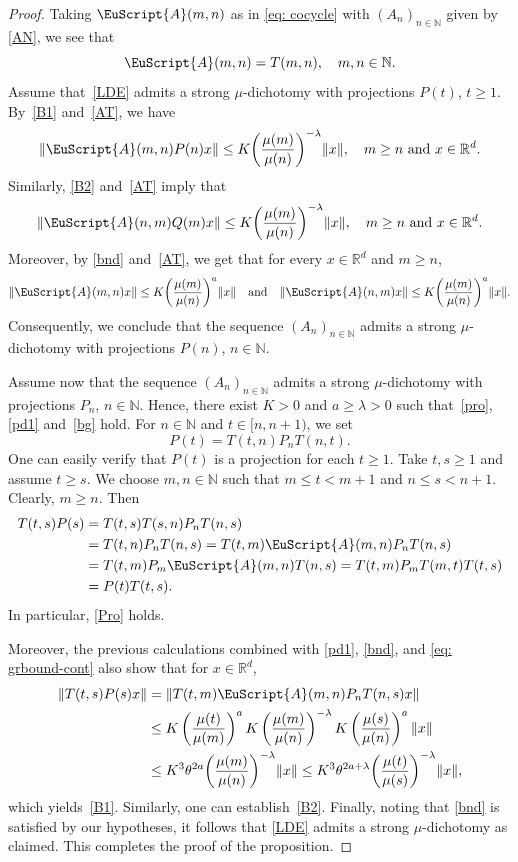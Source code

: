 \documentclass[reqno, a4paper, 10pt]{amsart}
\theoremstyle{plain}
\numberwithin{equation}{section}
\theoremstyle{remark}
\def\N{\mathbb{N}}
\def\cA{\EuScript{A}}
\def\R{\mathbb{R}}
\begin{document}
\begin{proof}
Taking $\cA(m,n)$ as in \eqref{eq: cocycle} with $(A_n)_{n\in \N}$ given by \eqref{AN}, we see that
\begin{equation}\label{AT}
\cA(m,n)=T(m,n), \quad m, n\in \N.
\end{equation}
Assume that~\eqref{LDE} admits a strong $\mu$-dichotomy with projections $P(t)$, $t\ge 1$. By~\eqref{B1} and~\eqref{AT}, we have
\[
\| \cA(m,n)P(n)x\| \le K \bigg (\frac{\mu(m)}{\mu (n)}\bigg )^{-\lambda}\|x\|, \quad m\ge n \text{ and }x\in\R^d.
\]
Similarly, \eqref{B2} and~\eqref{AT} imply that 
\[
\| \cA(n,m)Q(m)x\| \le K \bigg (\frac{\mu(m)}{\mu (n)}\bigg )^{-\lambda}\|x\|, \quad m\ge n \text{ and }x\in\R^d.
\]
Moreover, by \eqref{bnd} and~\eqref{AT}, we get that for every $x\in \R^d$ and $m\ge n$,
\begin{equation*}
\| \cA(m,n)x\| \le {K}\bigg (\frac{\mu (m)}{\mu(n)}\bigg )^{a}\|x\| \quad \text{and} \quad \| \cA(n,m)x\| \le {K}\bigg (\frac{\mu (m)}{\mu(n)}\bigg )^{a}\|x\|.
\end{equation*}
Consequently, we conclude that the sequence $(A_n)_{n\in \N}$ admits a strong $\mu$-dichotomy with projections $P(n)$, $n\in \N$.

Assume now that the sequence $(A_n)_{n\in \N}$ admits a strong $\mu$-dichotomy with projections $P_n$, $n\in \N$. Hence, there exist $K>0$ and $a\geq \lambda >0$ such that~\eqref{pro}, \eqref{pd1} and~\eqref{bg} hold.
For $n\in \N$ and $t\in [n, n+1)$, we set
\[
P(t)=T(t,n)P_n T(n,t).
\]
One can easily verify that $P(t)$ is a projection for each $t\ge 1$.
Take $t,s\geq 1$ and assume $t\geq s$. We choose $m, n\in \N$ such that $m\le t<m+1$ and $n\le s <n+1$. Clearly, $m\ge n$. Then
\[
\begin{split}
T(t,s)P(s)&=T(t,s)T(s,n)P_nT(n, s)\\
&=T(t,n)P_n T(n,s) =T(t,m)\cA(m,n)P_n T(n,s)\\
&=T(t,m)P_m\cA(m,n) T(n,s)=T(t,m)P_m T(m,t)T(t,s)\\
&=P(t)T(t,s).
\end{split}
\]
In particular, \eqref{Pro} holds. 

Moreover, the previous calculations combined with \eqref{pd1}, \eqref{bnd}, and \eqref{eq: grbound-cont} also show that for $x\in \R^d$,
\[
\begin{split}
\|T(t,s)P(s)x \| &=\| T(t,m)\cA(m,n)P_n T(n,s)x\|\\
&\leq K \left(\frac{\mu(t)}{\mu(m)}\right)^a K\left(\frac{\mu(m)}{\mu(n)}\right)^{-\lambda} K\left(\frac{\mu(s)}{\mu(n)}\right)^a\|x\|    \\
&\le K^3 \theta^{2a} \bigg (\frac{\mu(m)}{\mu(n)}\bigg )^{-\lambda}\|x\|
\le K^3 \theta^{2a+\lambda} \bigg (\frac{\mu(t)}{\mu (s)} \bigg )^{-\lambda}\|x\|,
\\
\end{split}
\]
which yields~\eqref{B1}. Similarly, one can establish~\eqref{B2}. Finally, noting that \eqref{bnd} is satisfied by our hypotheses, it follows that \eqref{LDE} admits a strong $\mu$-dichotomy as claimed. This completes the proof of the proposition.
\end{proof}
\end{document}
